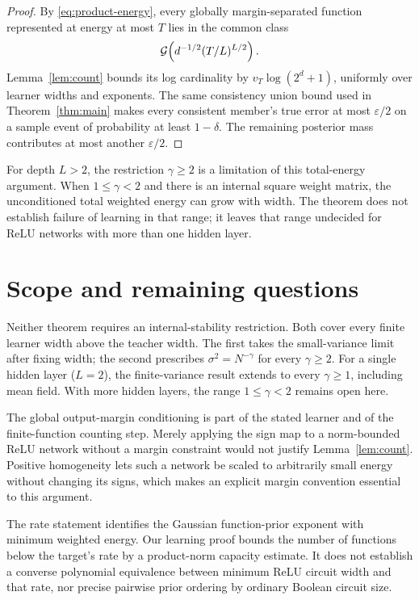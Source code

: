 \documentclass[11pt]{article}
\theoremstyle{remark}\newtheorem{remark}[theorem]{Remark}
\begin{document}
\begin{proof}
By \eqref{eq:product-energy}, every globally margin-separated function represented at energy at most $T$ lies in the common class
\[
 \mathcal G\!\left(d^{-1/2}(T/L)^{L/2}\right).
\]
Lemma~\ref{lem:count} bounds its log cardinality by $v_T\log(2^d+1)$, uniformly over learner widths and exponents. The same consistency union bound used in Theorem~\ref{thm:main} makes every consistent member's true error at most $\varepsilon/2$ on a sample event of probability at least $1-\delta$. The remaining posterior mass contributes at most another $\varepsilon/2$.
\end{proof}

For depth $L>2$, the restriction $\gamma\ge2$ is a limitation of this total-energy argument. When $1\le\gamma<2$ and there is an internal square weight matrix, the unconditioned total weighted energy can grow with width. The theorem does not establish failure of learning in that range; it leaves that range undecided for ReLU networks with more than one hidden layer.

\section{Scope and remaining questions}
Neither theorem requires an internal-stability restriction. Both cover every finite learner width above the teacher width. The first takes the small-variance limit after fixing width; the second prescribes $\sigma^2=N^{-\gamma}$ for every $\gamma\ge2$. For a single hidden layer ($L=2$), the finite-variance result extends to every $\gamma\ge1$, including mean field. With more hidden layers, the range $1\le\gamma<2$ remains open here.

The global output-margin conditioning is part of the stated learner and of the finite-function counting step. Merely applying the sign map to a norm-bounded ReLU network without a margin constraint would not justify Lemma~\ref{lem:count}. Positive homogeneity lets such a network be scaled to arbitrarily small energy without changing its signs, which makes an explicit margin convention essential to this argument.

The rate statement identifies the Gaussian function-prior exponent with minimum weighted energy. Our learning proof bounds the number of functions below the target's rate by a product-norm capacity estimate. It does not establish a converse polynomial equivalence between minimum ReLU circuit width and that rate, nor precise pairwise prior ordering by ordinary Boolean circuit size.
\end{document}
